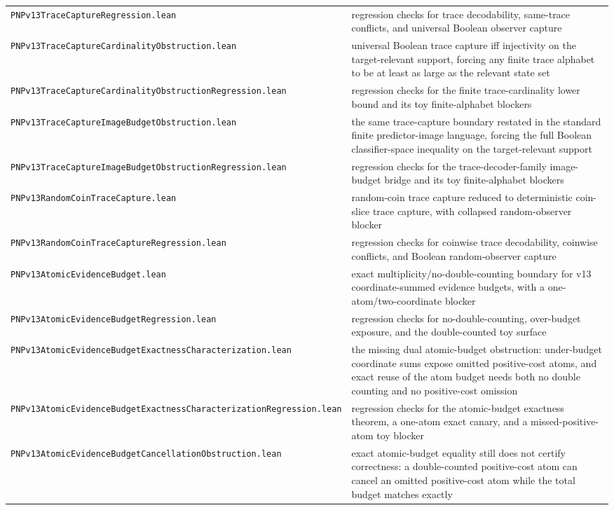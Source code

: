 \documentclass[11pt]{article}
\theoremstyle{remark}
\begin{document}
\begin{center}
\begin{tabular}{ll}
\texttt{PNPv13TraceCaptureRegression.lean} & regression checks for trace decodability, same-trace conflicts, and universal Boolean observer capture \\
\texttt{PNPv13TraceCaptureCardinalityObstruction.lean} & universal Boolean trace capture iff injectivity on the target-relevant support, forcing any finite trace alphabet to be at least as large as the relevant state set \\
\texttt{PNPv13TraceCaptureCardinalityObstructionRegression.lean} & regression checks for the finite trace-cardinality lower bound and its toy finite-alphabet blockers \\
\texttt{PNPv13TraceCaptureImageBudgetObstruction.lean} & the same trace-capture boundary restated in the standard finite predictor-image language, forcing the full Boolean classifier-space inequality on the target-relevant support \\
\texttt{PNPv13TraceCaptureImageBudgetObstructionRegression.lean} & regression checks for the trace-decoder-family image-budget bridge and its toy finite-alphabet blockers \\
\texttt{PNPv13RandomCoinTraceCapture.lean} & random-coin trace capture reduced to deterministic coin-slice trace capture, with collapsed random-observer blocker \\
\texttt{PNPv13RandomCoinTraceCaptureRegression.lean} & regression checks for coinwise trace decodability, coinwise conflicts, and Boolean random-observer capture \\
\texttt{PNPv13AtomicEvidenceBudget.lean} & exact multiplicity/no-double-counting boundary for v13 coordinate-summed evidence budgets, with a one-atom/two-coordinate blocker \\
\texttt{PNPv13AtomicEvidenceBudgetRegression.lean} & regression checks for no-double-counting, over-budget exposure, and the double-counted toy surface \\
\texttt{PNPv13AtomicEvidenceBudgetExactnessCharacterization.lean} & the missing dual atomic-budget obstruction: under-budget coordinate sums expose omitted positive-cost atoms, and exact reuse of the atom budget needs both no double counting and no positive-cost omission \\
\texttt{PNPv13AtomicEvidenceBudgetExactnessCharacterizationRegression.lean} & regression checks for the atomic-budget exactness theorem, a one-atom exact canary, and a missed-positive-atom toy blocker \\
\texttt{PNPv13AtomicEvidenceBudgetCancellationObstruction.lean} & exact atomic-budget equality still does not certify correctness: a double-counted positive-cost atom can cancel an omitted positive-cost atom while the total budget matches exactly \\

\end{tabular}
\end{center}
\end{document}
